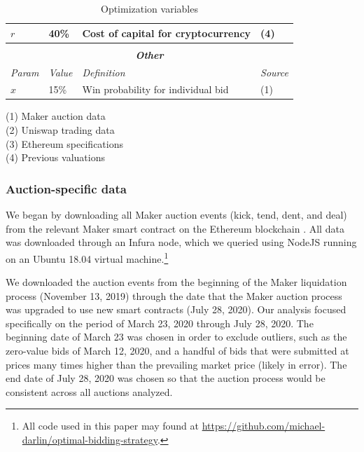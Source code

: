\documentclass[conference]{IEEEtran}
\begin{document}
\begin{table}[htb]
{\begin{tabular}{|l | l | l| l|}
            $r$ & 40\% & Cost of capital for cryptocurrency & (4) \\
            \hline
            \multicolumn{4}{c}{ } \\
            \hline
            \multicolumn{4}{|c|}{\textbf{\textit{Other}}} \\
            \hline
            \it Param & \it Value & \it Definition & \it Source  \\
            \hline
            $x$ & 15\% & Win probability for individual bid & (1) \\
            \hline
        \end{tabular}
    }
    \vspace{0.1cm}
    
    (1) Maker auction data \\
    (2) Uniswap trading data \\
    (3) Ethereum specifications \\
    (4) Previous valuations \\

    \caption{Optimization variables}
    \label{table2}
\end{table}

\subsubsection{Auction-specific  data}
We began by downloading all Maker auction events (kick, tend, dent, and deal) from the relevant Maker smart contract on the Ethereum blockchain \cite{makerHistory}. All data was downloaded through an Infura node, which we queried using NodeJS running on an Ubuntu 18.04 virtual machine.\footnote{All code used in this paper may found at \url{https://github.com/michael-darlin/optimal-bidding-strategy}.}

We downloaded the auction events from the beginning of the Maker liquidation process (November 13, 2019) through the date that the Maker auction process was upgraded to use new smart contracts (July 28, 2020). Our analysis focused specifically on the period of March 23, 2020 through July 28, 2020. The beginning date of March 23 was chosen in order to exclude outliers, such as the zero-value bids of March 12, 2020, and a handful of bids that were submitted at prices many times higher than the prevailing market price (likely in error). The end date of July 28, 2020 was chosen so that the auction process would be consistent across all auctions analyzed.
\end{document}
